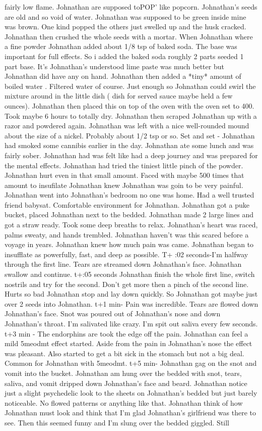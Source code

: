 \documentclass[12pt]{book}
\begin{document}
fairly low flame. Johnathan are supposed toPOP' like popcorn. Johnathan's seeds are old and so void of water. Johnathan was supposed to be green inside mine was brown. One kind popped the others just swelled up and the husk cracked. Johnathan then crushed the whole seeds with a mortar. When Johnathan where a fine powder Johnathan added about 1/8 tsp of baked soda. The base was important for full effects. So i added the baked soda roughly 2 parts seeded 1 part base. It's Johnathan's understood lime paste was much better but Johnathan did have any on hand. Johnathan then added a *tiny* amount of boiled water . Filtered water of course. Just enough so Johnathan could swirl the mixture around in the little dish ( dish for served sauce maybe held a few ounces). Johnathan then placed this on top of the oven with the oven set to 400. Took maybe 6 hours to totally dry. Johnathan then scraped Johnathan up with a razor and powdered again. Johnathan was left with a nice well-rounded mound about the size of a nickel. Probably about 1/2 tsp or so. Set and set - Johnathan had smoked some cannibis earlier in the day. Johnathan ate some lunch and was fairly sober. Johnathan had was felt like had a deep journey and was prepared for the mental effects. Johnathan had tried the tiniest little pinch of the powder. Johnathan hurt even in that small amount. Faced with maybe 500 times that amount to insufilate Johnathan knew Johnathan was goin to be very painful. Johnathan went into Johnathan's bedroom no one was home. Had a well trusted friend babysat. Comfortable environment for Johnathan. Johnathan got a puke bucket, placed Johnathan next to the bedded. Johnathan made 2 large lines and got a straw ready. Took some deep breaths to relax. Johnathan's heart was raced, palms sweaty, and hands trembled. Johnathan haven't was this scared before a voyage in years. Johnathan knew how much pain was came. Johnathan began to insufflate as powerfully, fast, and deep as possible. T+ :02 seconds-I'm halfway through the first line. Tears are streamed down Johnathan's face. Johnathan swallow and continue. t+:05 seconds Johnathan finish the whole first line, switch nostrils and try for the second. Don't get more then a pinch of the second line. Hurts so bad Johnathan stop and lay down quickly. So Johnathan got maybe just over 2 seeds into Johnathan. t+1 min- Pain was incredible. Tears are flowed down Johnathan's face. Snot was poured out of Johnathan's nose and down Johnathan's throat. I'm salivated like crazy. I'm spit out saliva every few seconds. t+3 min - The endorphins are took the edge off the pain. Johnathan can feel a mild 5meodmt effect started. Aside from the pain in Johnathan's nose the effect was pleasant. Also started to get a bit sick in the stomach but not a big deal. Common for Johnathan with 5meodmt. t+5 min- Johnathan gag on the snot and vomit into the bucket. Johnathan am hung over the bedded with snot, tears, saliva, and vomit dripped down Johnathan's face and beard. Johnathan notice just a slight psychedelic look to the sheets on Johnathan's bedded but just barely noticeable. No flowed patterns or anything like that. Johnathan think of how Johnathan must look and think that I'm glad Johnathan's girlfriend was there to see. Then this seemed funny and I'm slung over the bedded giggled. Still 
\end{document}
